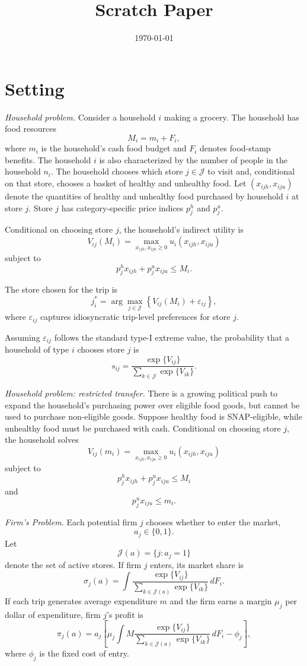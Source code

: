 \documentclass[12pt]{article}
\title{Scratch Paper}
\date{\today}
\begin{document}
\linenumbers

\maketitle

\section{Setting}
\textit{Household problem.}
Consider a household $i$ making a grocery. The household has food resources
\[
M_i=m_i+F_i,
\]
where $m_i$ is the household's cash food budget and $F_i$ denotes food-stamp
benefits. The household $i$ is also characterized by the number of people in the household $n_i$. The household chooses which store $j\in\mathcal J$ to visit and, conditional
on that store, chooses a basket of healthy and unhealthy food. Let
$(x_{ijh},x_{iju})$ denote the quantities of healthy and unhealthy food purchased by
household $i$ at store $j$. Store $j$ has category-specific price indices $p^h_j$ and
$p^u_j$.

Conditional on choosing store $j$, the household's indirect utility is
\[
V_{ij}(M_i)
=
\max_{x_{ijh},x_{iju}\geq 0}
u_i(x_{ijh},x_{iju})
\]
subject to
\[
p^h_j x_{ijh}+p^u_j x_{iju}\leq M_i.
\]

The store chosen for the trip is
\[
j_i^*
=
\arg\max_{j\in\mathcal J}
\left\{
V_{ij}(M_i)+\varepsilon_{ij}
\right\},
\]
where $\varepsilon_{ij}$ captures idiosyncratic trip-level preferences for store $j$.

Assuming $\varepsilon_{ij}$ follows the standard type-I extreme value, the probability that a household of type $i$ chooses store $j$ is
\[
s_{ij}
=
\frac{\exp\{V_{ij}\}}
{\sum_{k\in\mathcal J}\exp\{V_{ik}\}}.
\]



\textit{Household problem: restricted transfer.} There is a growing political push to expand the household's purchasing power over eligible food goods, but cannot be used to purchase non-eligible goods. Suppose healthy food is SNAP-eligible, while unhealthy food must be purchased with cash. Conditional on choosing store $j$, the household solves
\[
V_{ij}(m_i)
=
\max_{x_{ijh},x_{iju}\geq 0}
u_i(x_{ijh},x_{iju})
\]
subject to
\[
p^h_j x_{ijh}+p^u_j x_{iju}\leq M_i
\]
and
\[
p^u_j x_{iju}\leq  m_i.
\]



\textit{Firm's Problem.} Each potential firm $j$ chooses whether to enter the market,
\[
a_j\in\{0,1\}.
\]
Let
\[
\mathcal J(a)=\{j:a_j=1\}
\]
denote the set of active stores. If firm $j$ enters, its market share is
\[
\sigma_j(a)
=
\int
\frac{\exp\{V_{ij}\}}
{\sum_{k\in\mathcal J(a)}\exp\{V_{ik}\}}
\,dF_i.
\]
If each trip generates average expenditure $m$ and the firm earns a margin $\mu_j$ per
dollar of expenditure, firm $j$'s profit is
\[
\pi_j(a)
=
a_j
\left[
\mu_j
\int
M
\frac{\exp\{V_{ij}\}}
{\sum_{k\in\mathcal J(a)}\exp\{V_{ik}\}}
\,dF_i
-
\phi_j
\right],
\]
where $\phi_j$ is the fixed cost of entry.
\end{document}
